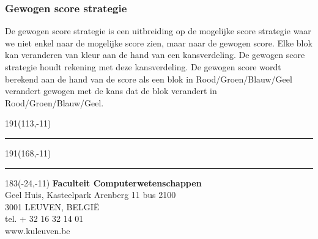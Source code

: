 \documentclass[12pt,a4paper,oneside]{book}
\begin{document}
\subsubsection{Gewogen score strategie}
De gewogen score strategie is een uitbreiding op de mogelijke score strategie waar we niet enkel naar de mogelijke score zien, maar naar de gewogen score. Elke blok kan veranderen van kleur aan de hand van een kansverdeling. De gewogen score strategie houdt rekening met deze kansverdeling. De gewogen score wordt berekend aan de hand van de score als een blok in Rood/Groen/Blauw/Geel verandert gewogen met de kans dat de blok verandert in Rood/Groen/Blauw/Geel.




\newpage
\thispagestyle{empty}
\sffamily
%
\begin{textblock}{191}(113,-11)
{\color{blueline}\rule{160pt}{5.5pt}}
\end{textblock}
%
\begin{textblock}{191}(168,-11)
{\color{blueline}\rule{5.5pt}{59pt}}
\end{textblock}
%
\begin{textblock}{183}(-24,-11)
\textblockcolour{}
\flushright
\fontsize{7}{7.5}\selectfont
\textbf{Faculteit Computerwetenschappen}\\
Geel Huis, Kasteelpark Arenberg 11 bus 2100\\
3001 LEUVEN, BELGI\"{E}\\
tel. + 32 16 32 14 01\\
www.kuleuven.be\\
\end{textblock}
%
\end{document}
